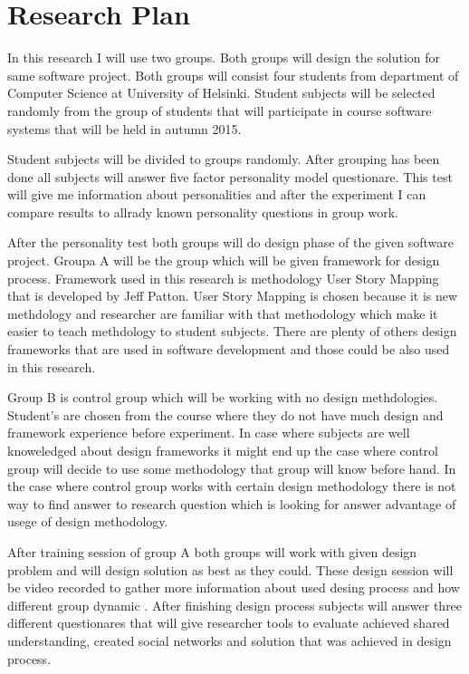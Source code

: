 \documentclass[english]{tktltiki2}
\theoremstyle{definition}
\theoremstyle{remark}
\begin{document}
\section{Research Plan}


In this research I will use two groups. Both groups will design the solution for same software project. Both groups will consist four students from department of Computer Science at University of Helsinki. Student subjects will be selected randomly from the group of students that will participate in course software systems that will be held in autumn 2015.

Student subjects will be divided to groups randomly. After grouping has been done all subjects will answer five factor personality model questionare\cite{fiveFactor}. This test will give me information about personalities and after the experiment I can compare results to allrady known personality questions in group work.

After the personality test both groups will do design phase of the given software project. Groupa A will be the group which will be given framework for design process. Framework used in this research is methodology User Story Mapping that is developed by Jeff Patton\cite{userStoryMapping}. User Story Mapping is chosen because it is new methdology and researcher are familiar with that methodology which make it easier to teach methdology to student subjects. There are plenty of others design frameworks that are used in software development and those could be also used in this research.

Group B is control group which will be working with no design methdologies. Student's are chosen from the course where they do not have much design and framework experience before experiment. In case where subjects are well knoweledged about design frameworks it might end up the case where control group will decide to use some methodology that group will know before hand. In the case where control group works with certain design methodology there is not way to find answer to research question which is looking for answer advantage of usege of design methodology.

After training session of group A both groups will work with given design problem and will design solution as best as they could. These design session will be video recorded to gather more information about used desing process and how different group dynamic . After finishing design process subjects will answer three different questionares that will give researcher tools to evaluate achieved shared understanding, created social networks and solution that was achieved in design process.
\end{document}
